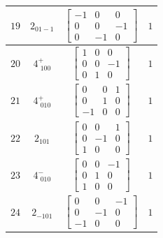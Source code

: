 \documentclass[fleqn,8pt]{jsarticle}
\begin{document}
\begin{longtable}{cccc}
$ 19 $ & $ 2{}_{01-1} $ & $ \begin{bmatrix} -1 & 0 & 0 \\ 0 & 0 & -1 \\ 0 & -1 & 0 \end{bmatrix} $ & $ 1 $ \\ \hline
$ 20 $ & $ 4^{+}_{\,\,100} $ & $ \begin{bmatrix} 1 & 0 & 0 \\ 0 & 0 & -1 \\ 0 & 1 & 0 \end{bmatrix} $ & $ 1 $ \\ \hline
$ 21 $ & $ 4^{+}_{\,\,010} $ & $ \begin{bmatrix} 0 & 0 & 1 \\ 0 & 1 & 0 \\ -1 & 0 & 0 \end{bmatrix} $ & $ 1 $ \\ \hline
$ 22 $ & $ 2{}_{101} $ & $ \begin{bmatrix} 0 & 0 & 1 \\ 0 & -1 & 0 \\ 1 & 0 & 0 \end{bmatrix} $ & $ 1 $ \\ \hline
$ 23 $ & $ 4^{-}_{\,\,010} $ & $ \begin{bmatrix} 0 & 0 & -1 \\ 0 & 1 & 0 \\ 1 & 0 & 0 \end{bmatrix} $ & $ 1 $ \\ \hline
$ 24 $ & $ 2{}_{-101} $ & $ \begin{bmatrix} 0 & 0 & -1 \\ 0 & -1 & 0 \\ -1 & 0 & 0 \end{bmatrix} $ & $ 1 $ \\
\end{longtable}
\end{document}
